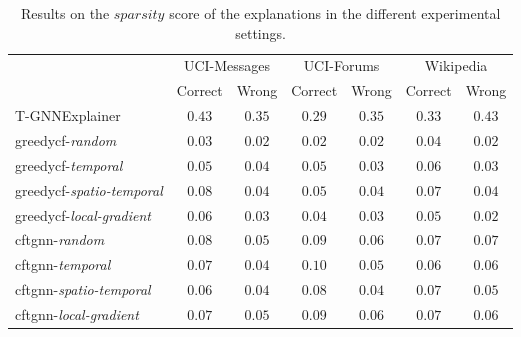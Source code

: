 \begin{table}[ht]
    \centering
    \small
    \begin{tabular}{lcccccc}
    \hline
         &  \multicolumn{2}{c}{UCI-Messages}&  \multicolumn{2}{c}{UCI-Forums}&  \multicolumn{2}{c}{Wikipedia}\\
         &  Correct&  Wrong&  Correct&  Wrong&  Correct& Wrong\\
         \hline
         T-GNNExplainer&  $0.43$&  $0.35$&  $0.29$&  $0.35$&  $0.33$& $0.43$\\
         \gls{greedycf}-\textit{random}&  $0.03$&  $0.02$&  $0.02$&  $0.02$&  $0.04$& $0.02$\\
         \gls{greedycf}-\textit{temporal}&  $0.05$&  $0.04$&  $0.05$&  $0.03$&  $0.06$& $0.03$\\
         \gls{greedycf}-\textit{spatio-temporal}&  $0.08$&  $0.04$&  $0.05$&  $0.04$&  $0.07$& $0.04$\\
         \gls{greedycf}-\textit{local-gradient}&  $0.06$&  $0.03$&  $0.04$&  $0.03$&  $0.05$& $0.02$\\
         \gls{cftgnn}-\textit{random}&  $0.08$&  $0.05$&  $0.09$&  $0.06$&  $0.07$& $0.07$\\
         \gls{cftgnn}-\textit{temporal}&  $0.07$&  $0.04$&  $0.10$&  $0.05$&  $0.06$& $0.06$\\
         \gls{cftgnn}-\textit{spatio-temporal}&  $0.06$&  $0.04$&  $0.08$&  $0.04$&  $0.07$& $0.05$\\
 \gls{cftgnn}-\textit{local-gradient}& $0.07$& $0.05$& $0.09$& $0.06$& $0.07$&$0.06$\\
 \hline
    \end{tabular}
    \caption{Results on the $sparsity$ score of the explanations in the different experimental settings.}
    \label{t_spar}
\end{table}

